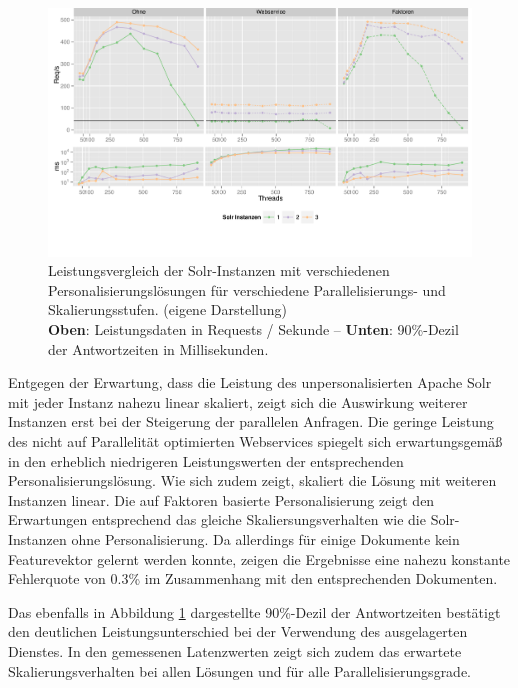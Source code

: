 \begin{figure}[htb]
  \centering
    \includegraphics[width=\textwidth]{Abbildungen/personalisierung.pdf}
    \caption[Leistung d. personalisierten Suche]{Leistungsvergleich der Solr-Instanzen mit verschiedenen Personalisierungslösungen für verschiedene Parallelisierungs- und Skalierungsstufen.  {\scriptsize (eigene Darstellung)} \\ { \footnotesize \textbf{Oben}: Leistungsdaten in Requests / Sekunde -- \textbf{Unten}: 90\%-Dezil der Antwortzeiten in Millisekunden.}} 
    \label{fig:chart_solr}
\end{figure}

Entgegen der Erwartung, dass die Leistung des unpersonalisierten Apache Solr mit jeder Instanz nahezu linear skaliert, zeigt sich die Auswirkung weiterer Instanzen erst bei der Steigerung der parallelen Anfragen.  Die geringe Leistung des nicht auf Parallelität optimierten Webservices spiegelt sich erwartungsgemäß in den erheblich niedrigeren Leistungswerten der entsprechenden Personalisierungslösung. Wie sich zudem zeigt, skaliert die Lösung mit weiteren Instanzen linear. Die auf Faktoren basierte Personalisierung zeigt den Erwartungen entsprechend das gleiche Skaliersungsverhalten wie die Solr-Instanzen ohne Personalisierung. Da allerdings für einige Dokumente kein Featurevektor gelernt werden konnte, zeigen die Ergebnisse eine nahezu konstante Fehlerquote von 0.3\% im Zusammenhang mit den entsprechenden Dokumenten.

Das ebenfalls in Abbildung \ref{fig:chart_solr} dargestellte 90\%-Dezil der Antwortzeiten bestätigt den deutlichen Leistungsunterschied bei der Verwendung des ausgelagerten Dienstes. 
In den gemessenen Latenzwerten zeigt sich zudem das erwartete Skalierungsverhalten bei allen Lösungen und für alle Parallelisierungsgrade.

